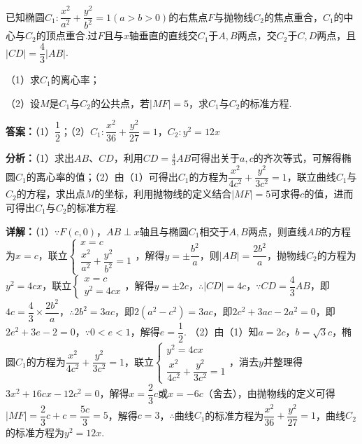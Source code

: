 \begin{question}[points=12]
已知椭圆$C_1:\dfrac{x^2}{a^2}+\dfrac{y^2}{b^2}=1(a>b>0)$的右焦点$F$与抛物线$C_2$的焦点重合，$C_1$的中心与$C_2$的顶点重合.过$F$且与$x$轴垂直的直线交$C_1$于$A,B$两点，交$C_2$于$C,D$两点，且$|CD|=\dfrac43|AB|$.

（1）求$C_1$的离心率；

（2）设$M$是$C_1$与$C_2$的公共点，若$|MF|=5$，求$C_1$与$C_2$的标准方程.
\begin{solution}
\textbf{答案：}（1）$\dfrac12$；（2）$C_1:\dfrac{x^2}{36}+\dfrac{y^2}{27}=1$，$C_2:y^2=12x$

\textbf{分析：}（1）求出$AB$、$CD$，利用$CD=\frac43AB$可得出关于$a,c$的齐次等式，可解得椭圆$C_1$的离心率的值；（2）由（1）可得出$C_1$的方程为$\dfrac{x^2}{4c^2}+\dfrac{y^2}{3c^2}=1$，联立曲线$C_1$与$C_2$的方程，求出点$M$的坐标，利用抛物线的定义结合$|MF|=5$可求得$c$的值，进而可得出$C_1$与$C_2$的标准方程.

\textbf{详解：}（1）$\because F(c,0)$，$AB\perp x$轴且与椭圆$C_1$相交于$A,B$两点，则直线$AB$的方程为$x=c$，联立$\begin{cases}x=c\\\dfrac{x^2}{a^2}+\dfrac{y^2}{b^2}=1\end{cases}$，解得$y=\pm\dfrac{b^2}{a}$，则$|AB|=\dfrac{2b^2}{a}$，抛物线$C_2$的方程为$y^2=4cx$，联立$\begin{cases}x=c\\y^2=4cx\end{cases}$，解得$y=\pm2c$，$\therefore |CD|=4c$，$\because CD=\dfrac43AB$，即$4c=\dfrac43\times\dfrac{2b^2}{a}$，$\therefore 2b^2=3ac$，即$2(a^2-c^2)=3ac$，即$2c^2+3ac-2a^2=0$，即$2e^2+3e-2=0$，$\because 0<e<1$，解得$e=\dfrac12$.
（2）由（1）知$a=2c$，$b=\sqrt3c$，椭圆$C_1$的方程为$\dfrac{x^2}{4c^2}+\dfrac{y^2}{3c^2}=1$，联立$\begin{cases}y^2=4cx\\\dfrac{x^2}{4c^2}+\dfrac{y^2}{3c^2}=1\end{cases}$，消去$y$并整理得$3x^2+16cx-12c^2=0$，解得$x=\dfrac23c$或$x=-6c$（舍去），由抛物线的定义可得$|MF|=\dfrac23c+c=\dfrac{5c}{3}=5$，解得$c=3$，$\therefore$曲线$C_1$的标准方程为$\dfrac{x^2}{36}+\dfrac{y^2}{27}=1$，曲线$C_2$的标准方程为$y^2=12x$.
\end{solution}
\end{question}

